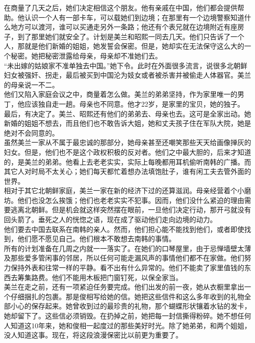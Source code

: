 在商量了几天之后，她们决定相信这个朋友。他有亲戚在中国，他们都会提供帮助。他认识一个人有一部卡车，可以载她们到边境；在那里有一个边境警察知道什么地方可以渡河，谁可以买通走另外一条路；他还有个表兄就在边境附近有座房子，到了那里她们就安全了。计划是美兰和昭熙一同去几天。他们只告诉了一个人，那就是他们新婚的姐姐，她发誓会保密。但是，她却实在无法保守这么大的一个秘密。她把秘密泄露给母亲，母亲却不准她们去。\\

“未出嫁的姑娘家不准单独去中国。”她下令。此时在外面很多流言，说很多北朝鲜妇女被强奸、拐走，最后被买到中国沦为妓女或者被杀害并被偷走人体器官。美兰的母亲说一不二。\\

他们又陷入家庭会议之中，商量着怎么做。美兰的弟弟坚持，作为家里唯一的男丁，他应该独自走一趟。母亲也不同意。他才22岁，是家里的宝贝，她的独子。\\

最后，有决定了。美兰、昭熙还有他们的弟弟去、母亲也去。这可是全家出动。她新婚的姐姐不想去，而且他们也不敢告诉大姐，她和丈夫孩子住在军队大院，她是绝对不会同意的。\\

虽然美兰一家从不属于最忠诚的那部分，她母亲甚至还嘲笑那些天天给画像掸灰的妇女。但是，他们也不是这个政权积极的反对者。他们之中最大胆的，后来才知道的，是美兰的弟弟。他看上去老老实实，实际上每晚都用耳机偷听南韩的广播。而其它人对时局不太关心；她们每天都忙着想办法填饱肚子，谁有闲工夫去管外面的世界。\\

相对于其它北朝鲜家庭，美兰一家在新的经济下过的还算滋润。母亲经营着个小磨坊。他们也没怎么挨饿；他们也老老实实不犯事。因而，他们没什么紧迫的理由需要逃离北朝鲜。但是机会就这样突然摆在眼前，一旦他们决定行动，那开弓就没有回头箭了。垂死之人的恍惚之语，现在成了驱动他们走向边境的动力。\\

他们要去中国去联系在南韩的亲人。然而，他们担心能不能找到他们，或者即使找到，他们愿不愿见自己。他们根本不敢想去南韩的事情。\\

所有的计划准备在几周之内就一一落实了。在她们的口琴屋里，由于忌惮墙壁太薄及那些爱多管闲事的邻居，所以任何可能走漏风声的事情他们都不在家做。他们努力保持外表和往常一样的平静。看不出有什么异常的。他们不能卖了家里值钱的东西去筹集路费。他们不能用木板把门窗钉死，以保全家当。\\

美兰在走之前，还有一项紧迫任务要完成。他们出发的前一夜，她从衣橱里拿出一个仔细捆扎的包裹。那是俊相写给她的信。她把这些信件和这么多年收到的礼物全部小心的保存起来。她曾收到过的最珍贵的礼物，那个蝴蝶形状镶着水钻的发卡，她却留下了。这些信必须销毁。在扔掉之前，她把每一封信撕得粉碎。她不想任何人知道这10年来，她和俊相一起度过的那些美好时光。除了她弟弟，和两个姐姐，没人知道这事。现在，将这段浪漫保密比以前更为重要了。\\

